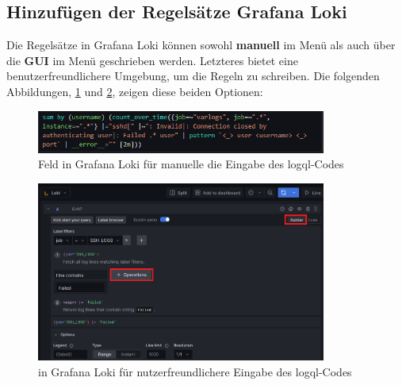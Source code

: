 

\newpage
\subsection{Hinzufügen der Regelsätze Grafana Loki}
Die Regelsätze in Grafana Loki können sowohl \textbf{manuell} im Menü  als auch über die \textbf{\gls{GUI}} im Menü  geschrieben werden. Letzteres bietet eine benutzerfreundlichere Umgebung, um die Regeln zu schreiben. Die folgenden Abbildungen, \ref{fig:Loki_Code} und \ref{fig:Loki_Builder}, zeigen diese beiden Optionen:

\begin{figure}[H]
   \centering
   \includegraphics[width=0.85\textwidth]{assets/manuellerCodeLoki.png}
   \caption[Feld in Grafana Loki für die manuelle die Eingabe des \gls{logql}-Codes]
   {Feld in Grafana Loki für manuelle die Eingabe des \gls{logql}-Codes}
   \label{fig:Loki_Code}
   \centering
\end{figure}

\begin{figure}[H]
   \centering
   \includegraphics[width=0.85\textwidth]{assets/klickibuntyGrafana.png}
   \caption[ in Grafana Loki für nutzerfreundlichere Eingabe des \gls{logql}-Codes.]
   { in Grafana Loki für nutzerfreundlichere Eingabe des \gls{logql}-Codes}
   \label{fig:Loki_Builder}
   \centering
\end{figure}

